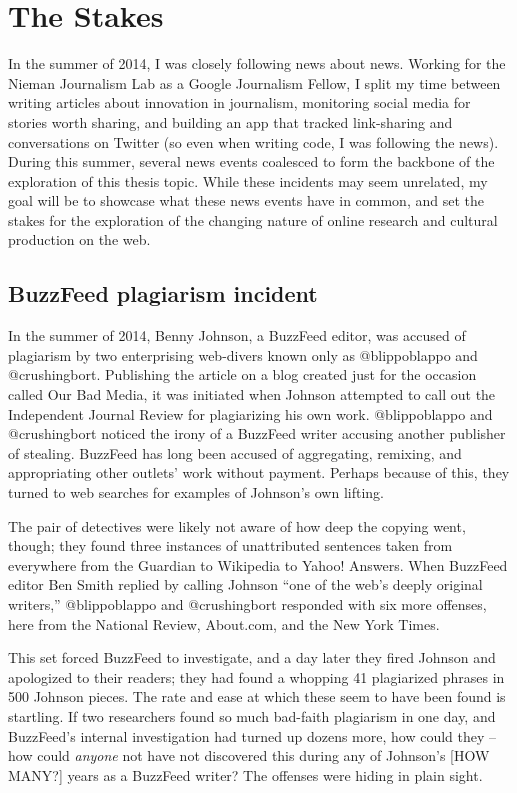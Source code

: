 \section{The Stakes}

In the summer of 2014, I was closely following news about news. Working for the Nieman Journalism Lab as a Google Journalism Fellow, I split my time between writing articles about innovation in journalism, monitoring social media for stories worth sharing, and building an app that tracked link-sharing and conversations on Twitter (so even when writing code, I was following the news). During this summer, several news events coalesced to form the backbone of the exploration of this thesis topic. While these incidents may seem unrelated, my goal will be to showcase what these news events have in common, and set the stakes for the exploration of the changing nature of online research and cultural production on the web.

\subsection{BuzzFeed plagiarism incident}

In the summer of 2014, Benny Johnson, a BuzzFeed editor, was accused of plagiarism by two enterprising web-divers known only as @blippoblappo and @crushingbort. Publishing the article on a blog created just for the occasion called Our Bad Media, it was initiated when Johnson attempted to call out the Independent Journal Review for plagiarizing his own work. @blippoblappo and @crushingbort noticed the irony of a BuzzFeed writer accusing another publisher of stealing. BuzzFeed has long been accused of aggregating, remixing, and appropriating other outlets' work without payment. Perhaps because of this, they turned to web searches for examples of Johnson's own lifting.

The pair of detectives were likely not aware of how deep the copying went, though; they found three instances of unattributed sentences taken from everywhere from the Guardian to Wikipedia to Yahoo! Answers. When BuzzFeed editor Ben Smith replied by calling Johnson ``one of the web's deeply original writers,'' @blippoblappo and @crushingbort responded with six more offenses, here from the National Review, About.com, and the New York Times.

This set forced BuzzFeed to investigate, and a day later they fired Johnson and apologized to their readers; they had found a whopping 41 plagiarized phrases in 500 Johnson pieces. The rate and ease at which these seem to have been found is startling. If two researchers found so much bad-faith plagiarism in one day, and BuzzFeed's internal investigation had turned up dozens more, how could they -- how could \emph{anyone} not have not discovered this during any of Johnson's [HOW MANY?] years as a BuzzFeed writer? The offenses were hiding in plain sight.

